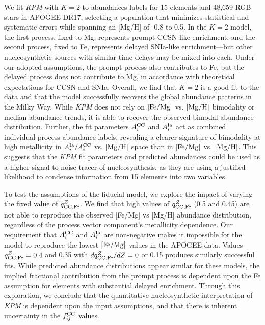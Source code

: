 \documentclass[modern]{aastex631}
\newcommand{\femg}{[{\rm Fe}/{\rm Mg}]}
\newcommand{\mgh}{[{\rm Mg}/{\rm H}]}
\newcommand{\qccFe}{q_{{\rm CC, Fe}}^{Z}}
\newcommand{\dqccFe}{dq_{{\rm CC, Fe}}^{Z}/dZ}
\newcommand{\Acc}{A^{\rm CC}_{i}}
\newcommand{\AIa}{A^{\rm Ia}_{i}}
\newcommand{\fcc}{f_{ij}^{\rm CC}}
\newcommand{\name}{\textsl{KPM}}
\begin{document}
We fit \name{} with $K=2$ to abundances labels for 15 elements and 48,659 RGB stars in APOGEE DR17, selecting a population that minimizes statistical and systematic errors while spanning an [Mg/H] of -0.8 to 0.5.
In the $K=2$ model, the first process, fixed to Mg, represents prompt CCSN-like enrichment, and the second process, fixed to Fe, represents delayed SNIa-like enrichment---but other nucleosynthetic sources with similar time delays may be mixed into each. Under our adopted assumptions, the prompt process also contributes to Fe, but the delayed process does not contribute to Mg, in accordance with theoretical expectations for CCSN and SNIa. Overall, we find that $K=2$ is a good fit to the data and that the model successfully recovers the global abundance patterns in the Milky Way. While \name{} does not rely on $\femg$ vs. $\mgh$ bimodality or median abundance trends, it is able to recover the observed bimodal abundance distribution. Further, the fit parameters $\Acc$ and $\AIa$ act as combined individual-process abundance labels, revealing a clearer signature of bimodality at high metallicity in $\AIa/\Acc$ vs. $\mgh$ space than in $\femg$ vs. $\mgh$. This suggests that the \name{} fit parameters and predicted abundances could be used as a higher signal-to-noise tracer of nucleosynthesis, as they are using a justified likelihood to condense information from 15 elements into two variables.

To test the assumptions of the fiducial model, we explore the impact of varying the fixed value of $\qccFe$.
We find that high values of $\qccFe$ (0.5 and 0.45) are not able to reproduce the observed [Fe/Mg] vs [Mg/H] abundance distribution, regardless of the process vector component's metallicity dependence.
Our requirement that $\Acc$ and $\AIa$ are non-negative makes it impossible for the model to reproduce the lowest $\femg$ values in the APOGEE data. Values $\qccFe = 0.4$ and 0.35 with $\dqccFe = 0$ or 0.15 produces similarly successful fits. While predicted abundance distributions appear similar for these models, the implied fractional contribution from the prompt process is dependent upon the Fe assumption for elements with substantial delayed enrichment. Through this exploration, we conclude that the quantitative nucleosynthetic interpretation of \name{} is dependent upon the input assumptions, and that there is inherent uncertainty in the $\fcc$ values. 
\end{document}
